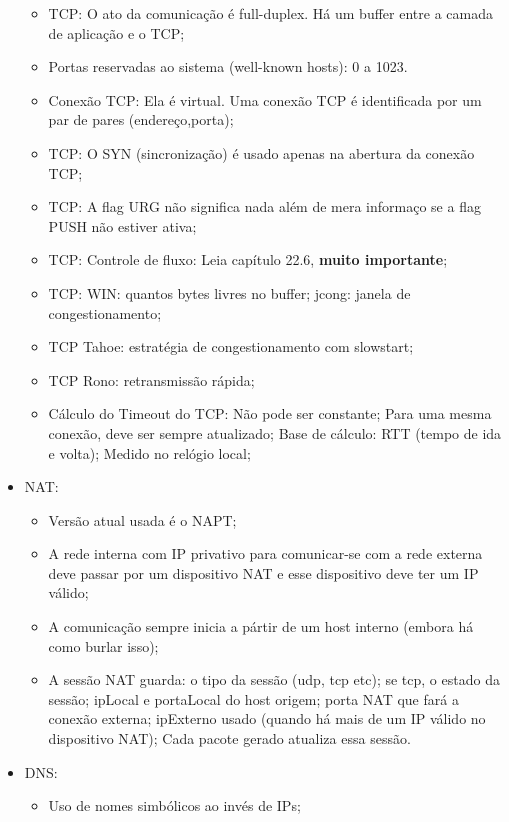 \documentclass{article}
\begin{document}
\begin{itemize}
      \begin{itemize}
         \item TCP: O ato da comunicação é full-duplex. Há um buffer entre a camada de aplicação e o TCP;
         \item Portas reservadas ao sistema (well-known hosts): 0 a 1023.
         \item Conexão TCP: Ela é virtual. Uma conexão TCP é identificada por um par de pares
(endereço,porta);
         \item TCP: O SYN (sincronização) é usado apenas na abertura da conexão TCP;
         \item TCP: A flag URG não significa nada além de mera informaço se a flag PUSH não estiver ativa;
         \item TCP: Controle de fluxo: Leia capítulo 22.6, \textbf{muito importante};
         \item TCP: WIN: quantos bytes livres no buffer; jcong: janela de congestionamento;
         \item TCP Tahoe: estratégia de congestionamento com slowstart;
         \item TCP Rono: retransmissão rápida;
         \item Cálculo do Timeout do TCP: Não pode ser constante; Para uma mesma conexão, deve ser
sempre atualizado; Base de cálculo: RTT (tempo de ida e volta); Medido no relógio local;
      \end{itemize}
   \item NAT:
      \begin{itemize}
         \item Versão atual usada é o NAPT;
         \item A rede interna com IP privativo para comunicar-se com a rede externa deve passar por
um dispositivo NAT e esse dispositivo deve ter um IP válido;
         \item A comunicação sempre inicia a pártir de um host interno (embora há como burlar isso);
         \item A sessão NAT guarda: o tipo da sessão (udp, tcp etc); se tcp, o estado da sessão;
ipLocal e portaLocal do host origem; porta NAT que fará a conexão externa; ipExterno usado (quando
há mais de um IP válido no dispositivo NAT); Cada pacote gerado atualiza essa sessão.
      \end{itemize}
   \item DNS:
      \begin{itemize}
         \item Uso de nomes simbólicos ao invés de IPs;

\end{itemize}
\end{itemize}
\end{document}

